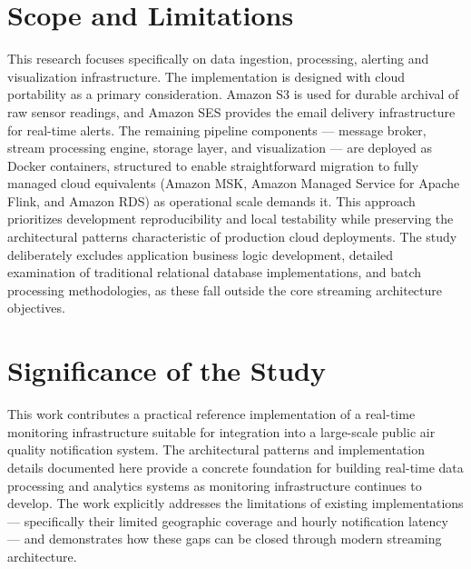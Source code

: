 \section{Scope and Limitations}
This research focuses specifically on data ingestion, processing, alerting and visualization infrastructure. The implementation is designed with cloud portability as a primary consideration. Amazon S3 is used for durable archival of raw sensor readings, and Amazon SES provides the email delivery infrastructure for real-time alerts. The remaining pipeline components — message broker, stream processing engine, storage layer, and visualization — are deployed as Docker containers, structured to enable straightforward migration to fully managed cloud equivalents (Amazon MSK, Amazon Managed Service for Apache Flink, and Amazon RDS) as operational scale demands it. This approach prioritizes development reproducibility and local testability while preserving the architectural patterns characteristic of production cloud deployments. The study deliberately excludes application business logic development, detailed examination of traditional relational database implementations, and batch processing methodologies, as these fall outside the core streaming architecture objectives.

\section{Significance of the Study}
This work contributes a practical reference implementation of a real-time monitoring infrastructure suitable for integration into a large-scale public air quality notification system. The architectural patterns and implementation details documented here provide a concrete foundation for building real-time data processing and analytics systems as monitoring infrastructure continues to develop. The work explicitly addresses the limitations of existing implementations — specifically their limited geographic coverage and hourly notification latency — and demonstrates how these gaps can be closed through modern streaming architecture.